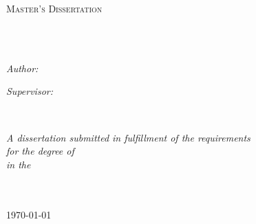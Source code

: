 \begin{titlepage}
    \begin{center}
    
    \vspace*{.06\textheight}
    {\scshape\LARGE \univname\par}\vspace{1.5cm} %
    \textsc{\Large Master's Dissertation}\\[0.5cm] %
    
    \HRule \\[0.4cm] %
    {\huge \bfseries \ttitle\par}\vspace{0.4cm} %
    \HRule \\[1.5cm] %
     
    \begin{minipage}[t]{0.4\textwidth}
    \begin{flushleft} \large
    \emph{Author:}\\
    \authorname %
    \end{flushleft}
    \end{minipage}
    \begin{minipage}[t]{0.4\textwidth}
    \begin{flushright} \large
    \emph{Supervisor:} \\
    \supname %
    \end{flushright}
    \end{minipage}\\[3cm]
     
    \vfill
    
    \large \textit{A dissertation submitted in fulfillment of the requirements\\
    for the degree of \degreename}\\[0.3cm] %
    \textit{in the}\\[0.4cm]
    \groupname\\\deptname\\[2cm] %
     
    \vfill
    
    {\large \today}\\[4cm] %
     
    \vfill
    \end{center}
\end{titlepage}